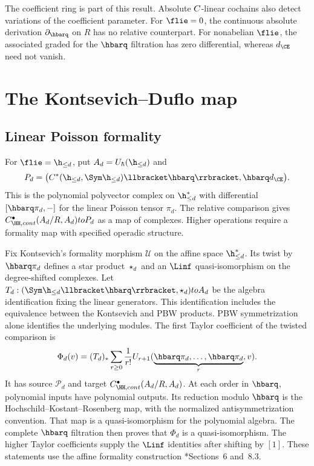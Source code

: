 The coefficient ring is part of this result.
Absolute $C$-linear cochains also detect variations of the coefficient parameter.
For $\flie=0$, the continuous absolute derivation $\partial_{\hbarq}$
on $R$ has no relative counterpart.
For nonabelian $\flie$, the associated graded for the $\hbarq$ filtration
has zero differential, whereas $d_{\CE}$ need not vanish.

\chapter{The Kontsevich--Duflo map}
\section{Linear Poisson formality}
For $\flie=\h_{\le d}$, put $A_d=U_\hbar(\h_{\le d})$ and
\[
 \mathcal P_d=
 \bigl(C^*(\h_{\le d},\Sym\h_{\le d})
       \llbracket\hbarq\rrbracket,\hbarq d_{\CE}\bigr).
\]
This is the polynomial polyvector complex on $\h_{\le d}^*$ with
differential $[\hbarq\pi_d,-]$ for the linear Poisson tensor $\pi_d$.
The relative comparison gives $C^\bullet_{\HH,\mathrm{cont}}(A_d/R,A_d)
\to\mathcal P_d$ as a map of complexes.
Higher operations require a formality map with specified operadic structure.

Fix Kontsevich's formality morphism $\mathcal U$ on the affine space
$\h_{\le d}^*$.
Its twist by $\hbarq\pi_d$ defines a star product $\star_d$ and an
$\Linf$ quasi-isomorphism on the degree-shifted complexes.
Let $T_d:(\Sym\h_{\le d}\llbracket\hbarq\rrbracket,\star_d)
\to A_d$ be the algebra identification fixing the linear generators.
This identification includes the equivalence between the Kontsevich and PBW products.
PBW symmetrization alone identifies the underlying modules.
The first Taylor coefficient of the twisted comparison is
\[
 \Phi_d(v)=(T_d)_*
 \sum_{r\ge0}\frac1{r!}
 \mathcal U_{r+1}
 (\underbrace{\hbarq\pi_d,\ldots,\hbarq\pi_d}_{r},v).
\]
It has source $\mathcal P_d$ and target
$C^\bullet_{\HH,\mathrm{cont}}(A_d/R,A_d)$.
At each order in $\hbarq$, polynomial inputs have polynomial outputs.
Its reduction modulo $\hbarq$ is the Hochschild--Kostant--Rosenberg map,
with the normalized antisymmetrization convention.
That map is a quasi-isomorphism for the polynomial algebra.
The complete $\hbarq$ filtration then proves that $\Phi_d$ is a quasi-isomorphism.
The higher Taylor coefficients supply the $\Linf$ identities after shifting by $[1]$.
These statements use the affine formality construction
\cite{KontsevichDQ}*{Sections~6 and~8.3}.

